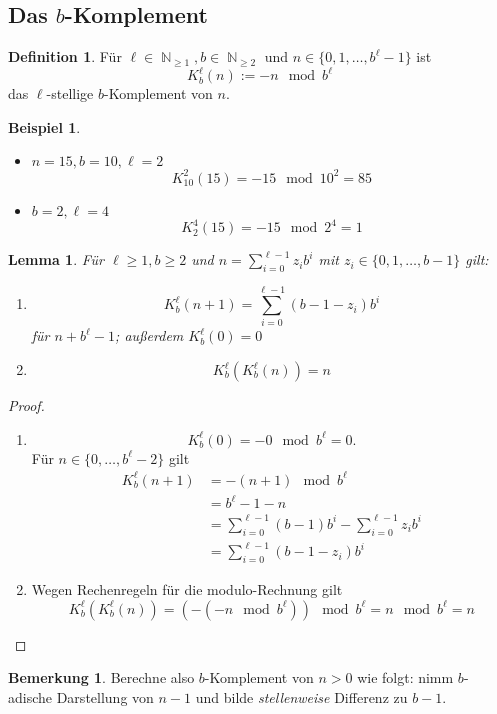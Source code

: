 \documentclass[a4paper,12pt]{article}
\DeclareMathOperator{\N}{\mathbb N}
\newtheorem{lemma}[axiom]{Lemma}
\theoremstyle{definition}
\newtheorem*{example}{Beispiel}
\newtheorem*{bemerkung}{Bemerkung}
\newtheorem{definition}[axiom]{Definition}
\begin{document}
	\subsection{Das $b$-Komplement}
	\begin{definition}
		Für $\ell \in \N_{\geq 1}, b \in \N_{\geq 2}$ und $n \in \{0,1,\ldots, b^\ell - 1\}$ ist
		\[
			K_b^\ell(n) := -n \mod b^\ell
		\]
		das $\ell$-stellige $b$-Komplement von $n$.
	\end{definition}
	\begin{example}
		\begin{itemize}
			\item $n = 15, b = 10, \ell = 2$
		\[
			K_{10}^2(15) = -15 \mod 10^2 = 85
		\]
		\item $b = 2, \ell = 4$
		\[
			K_2^4(15) = -15 \mod 2^4 = 1
		\]
		\end{itemize}
	\end{example}
	\begin{lemma}
		Für $\ell \geq 1, b \geq 2$ und $n = \sum_{i = 0}^{\ell - 1}z_ib^i$ mit $z_i \in \{0,1,\ldots, b-1\}$ gilt:
		\begin{enumerate}[label=(\roman*)]
			\item \[
				K_b^\ell(n + 1) = \sum_{i = 0}^{\ell - 1}(b - 1 - z_i)b^i
			\]
			für $n + b^\ell - 1$; außerdem $K_b^\ell(0) = 0$
			\item \[
				K_b^\ell(K_b^\ell(n)) = n
			\]
		\end{enumerate}
	\end{lemma}
	\begin{proof}
		\begin{enumerate}[label=(\roman*)]
			\item \[
				K_b^\ell(0) = -0 \mod b^\ell = 0.
			\]
			Für $n \in \{0,\ldots, b^\ell - 2\}$ gilt
			\begin{align*}
				K_b^\ell(n + 1) &= -(n+1) \mod b^\ell\\
				&= b^\ell - 1 - n\\
				&= \sum_{i = 0}^{\ell - 1}(b-1)b^i - \sum_{i = 0}^{\ell - 1}z_i b^i\\
				&= \sum_{i = 0}^{\ell - 1}(b - 1 - z_i)b^i
			\end{align*}
			\item Wegen Rechenregeln für die modulo-Rechnung gilt
			\[
				K_b^\ell(K_b^\ell(n)) = (-(-n \mod b^\ell)) \mod b^\ell = n \mod b^\ell = n
			\]
		\end{enumerate}
	\end{proof}
	\begin{bemerkung}
		Berechne also $b$-Komplement von $n > 0$ wie folgt: nimm $b$-adische Darstellung von $n-1$ und bilde {\itshape stellenweise} Differenz zu $b-1$.
	\end{bemerkung}
\end{document}
